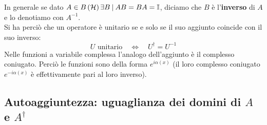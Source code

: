 \documentclass[../../FisicaTeorica.tex]{subfiles}
\begin{document}
In generale se dato $A\in B\left(\mathcal{H}\right) \exists B\>|\> AB=BA=\mathbb{I}$, diciamo che $B$ è l'\textbf{inverso} di $A$ e lo denotiamo con $A^{-1}$. \\
Si ha perciò che un operatore è unitario se e solo se il suo aggiunto coincide con il suo inverso:
\[
U \text{ unitario} \quad \Leftrightarrow \quad U^\dag=U^{-1}
\]
Nelle funzioni a variabile complessa l'analogo dell'aggiunto è il complesso coniugato. Perciò le funzioni  sono della forma $e^{i\alpha\left(x\right)}$ (il loro complesso coniugato $e^{-i\alpha(x)}$ è effettivamente pari al loro inverso). \\

\subsection{Autoaggiuntezza: uguaglianza dei domini di $A$ e $A^\dag$}
\end{document}
